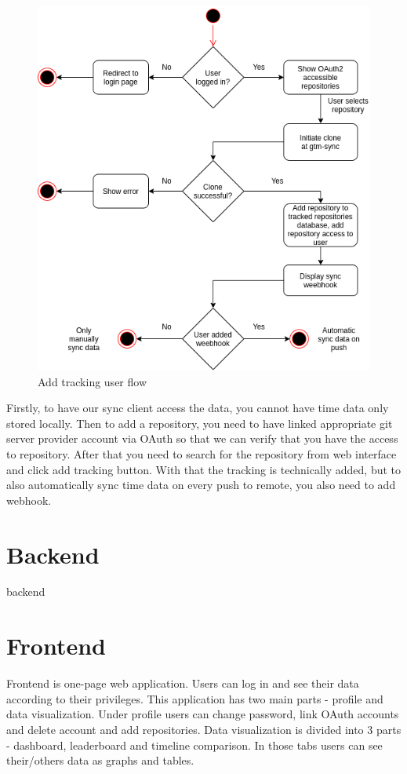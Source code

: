 \begin{figure}[h]
    \includegraphics[width=\textwidth]{figures/add_repo_user_flow}
    \caption{Add tracking user flow}
    \label{fig:add-tracking-user-flow}
\end{figure}

Firstly, to have our sync client access the data, you cannot have time data only stored locally.
Then to add a repository, you need to have linked appropriate git server provider account via OAuth so that we can
verify that you have the access to repository.
After that you need to search for the repository from web interface and click add tracking button.
With that the tracking is technically added, but to also automatically sync time data on every push to remote,
you also need to add webhook.


\section{Backend}\label{sec:backend-content}
backend

\section{Frontend}\label{sec:frontend-content}
Frontend is one-page web application.
Users can log in and see their data according to their privileges.
This application has two main parts - profile and data visualization.
Under profile users can change password, link OAuth accounts and delete account and add repositories.
Data visualization is divided into 3 parts - dashboard, leaderboard and timeline comparison.
In those tabs users can see their/others data as graphs and tables.

